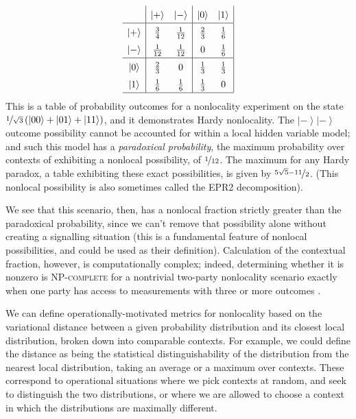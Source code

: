 \documentclass{amsart}
\theoremstyle{definition}
\newcommand{\ket}[1]{{\left\vert{#1}\right\rangle}}
\begin{document}
\begin{equation}\renewcommand{\arraystretch}{1.5}
\begin{array}{c| c c | c c |} \renewcommand{\arraystretch}{1.5}
&\ket{+}&\ket{-}&\ket{0}&\ket{1}\\\hline
\ket{+}&\frac{3}{4} &\frac{1}{12}  &\frac{2}{3} & \frac{1}{6}\\
\ket{-}&\frac{1}{12} &\frac{1}{12}  &0 &\frac{1}{6}\\ \hline
\ket{0}&\frac{2}{3}&0&\frac{1}{3} &\frac{1}{3} \\
\ket{1}&\frac{1}{6}&\frac{1}{6} &\frac{1}{3} &0 \\ \hline
\end{array} \renewcommand{\arraystretch}{1}
\end{equation}
This is a table of probability outcomes for a nonlocality experiment on the state $\nicefrac{1}{\sqrt{3}}\left(\ket{00}+\ket{01}+\ket{11}\right)$, and it demonstrates Hardy nonlocality. The $\ket{-}\ket{-}$ outcome possibility cannot be accounted for within a local hidden variable model; and such this model has a \emph{paradoxical probability}, the maximum probability over contexts of exhibiting a nonlocal possibility, of $\nicefrac{1}{12}$. The maximum for any Hardy paradox, a table exhibiting these exact possibilities, is given by $\nicefrac{5\sqrt{5}-11}{2}$. (This nonlocal possibility is also sometimes called the EPR2 decomposition).

We see that this scenario, then, has a nonlocal fraction strictly greater than the paradoxical probability, since we can't remove that possibility alone without creating a signalling situation (this is a fundamental feature of nonlocal possibilities, and could be used as their definition). Calculation of the contextual fraction, however, is computationally complex; indeed, determining whether it is nonzero is \textsc{NP-complete} for a 
nontrivial two-party nonlocality scenario exactly when one party has access to measurements with three or more outcomes \cite{SimmCC}.

We can define operationally-motivated metrics for nonlocality based on the variational distance between a given probability distribution and its closest local distribution, broken down into comparable contexts. For example, we could define the distance as being the statistical distinguishability of the distribution from the nearest local distribution, taking an average or a maximum over contexts. These correspond to operational situations where we pick contexts at random, and seek to distinguish the two distributions, or where we are allowed to choose a context in which the distributions are maximally different.
\end{document}
